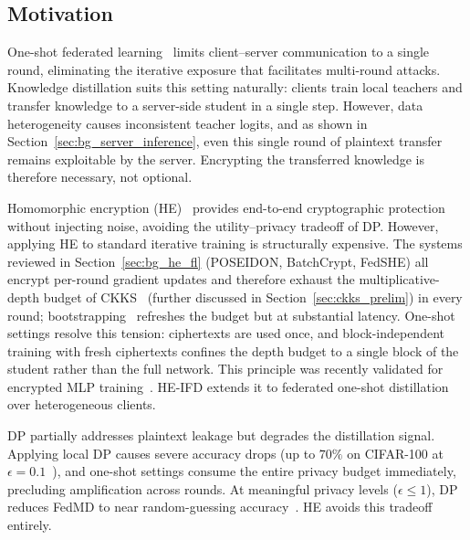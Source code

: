 
\subsection{Motivation}
\label{sec:intro_motivation}

One-shot federated learning~\cite{guha2019oneshot, wang2025towards} limits client--server communication to a single round, eliminating the iterative exposure that facilitates multi-round attacks. Knowledge distillation suits this setting naturally: clients train local teachers and transfer knowledge to a server-side student in a single step. However, data heterogeneity causes inconsistent teacher logits, and as shown in Section~\ref{sec:bg_server_inference}, even this single round of plaintext transfer remains exploitable by the server. Encrypting the transferred knowledge is therefore necessary, not optional.

Homomorphic encryption (HE)~\cite{cheon2017ckks} provides end-to-end cryptographic protection without injecting noise, avoiding the utility--privacy tradeoff of DP. However, applying HE to standard iterative training is structurally expensive. The systems reviewed in Section~\ref{sec:bg_he_fl} (POSEIDON, BatchCrypt, FedSHE) all encrypt per-round gradient updates and therefore exhaust the multiplicative-depth budget of CKKS~\cite{cheon2017ckks} (further discussed in Section~\ref{sec:ckks_prelim}) in every round; bootstrapping~\cite{cheon2018bootstrapping} refreshes the budget but at substantial latency. One-shot settings resolve this tension: ciphertexts are used once, and block-independent training with fresh ciphertexts confines the depth budget to a single block of the student rather than the full network. This principle was recently validated for encrypted MLP training~\cite{pirillo2025reboot}. HE-IFD extends it to federated one-shot distillation over heterogeneous clients.

DP partially addresses plaintext leakage but degrades the distillation signal. Applying local DP causes severe accuracy drops (up to $70\%$ on CIFAR-100 at $\epsilon = 0.1$~\cite{gad2024communication}), and one-shot settings consume the entire privacy budget immediately, precluding amplification across rounds. At meaningful privacy levels ($\epsilon \leq 1$), DP reduces FedMD to near random-guessing accuracy~\cite{sun2021fedmdnfdp}. HE avoids this tradeoff entirely.

